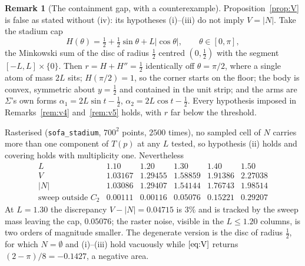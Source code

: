 \documentclass[11pt]{article}
\theoremstyle{definition}
\newtheorem{remark}[theorem]{Remark}
\newcommand{\Sig}{\Sigma}
\begin{document}
\begin{remark}[The containment gap, with a counterexample]\label{rem:v6}
Proposition~\ref{prop:V} is false as stated without (iv): its hypotheses (i)--(iii) do not imply
$V=|N|$. Take the stadium cap
\[
  H(\theta)=\tfrac12+\tfrac12\sin\theta+L|\cos\theta|,\qquad \theta\in[0,\pi],
\]
the Minkowski sum of the disc of radius $\tfrac12$ centred $(0,\tfrac12)$ with the segment
$[-L,L]\times\{0\}$. Then $r=H+H''=\tfrac12$ identically off $\theta=\pi/2$, where a single
atom of mass $2L$ sits; $H(\pi/2)=1$, so the corner starts on the floor; the body is convex,
symmetric about $y=\tfrac12$ and contained in the unit strip; and the arms are $\Sig$'s own
forms $\alpha_1=2L\sin t-\tfrac12$, $\alpha_2=2L\cos t-\tfrac12$. Every hypothesis imposed in
Remarks~\ref{rem:v4} and~\ref{rem:v5} holds, with $r$ far below the threshold.

Rasterised (\verb|sofa_stadium|, $700^2$ points, $2500$ times), no sampled cell of $N$
carries more than one component of $T(p)$ at any $L$ tested, so hypothesis (ii) holds and
covering holds with multiplicity one. Nevertheless
\[
  \begin{array}{r|ccccc}
    L & 1.10 & 1.20 & 1.30 & 1.40 & 1.50\\\hline
    V & 1.03167 & 1.29455 & 1.58859 & 1.91386 & 2.27038\\
    |N| & 1.03086 & 1.29407 & 1.54144 & 1.76743 & 1.98514\\
    \text{sweep outside }C_2 & 0.00111 & 0.00116 & 0.05076 & 0.15221 & 0.29207
  \end{array}
\]
At $L=1.30$ the discrepancy $V-|N|=0.04715$ is $3\%$ and is tracked by the sweep mass
leaving the cap, $0.05076$; the raster noise, visible in the $L\le1.20$ columns, is two
orders of magnitude smaller. The degenerate version is the disc of radius $\tfrac12$, for
which $N=\emptyset$ and (i)--(iii) hold vacuously while $\eqref{eq:V}$ returns
$(2-\pi)/8=-0.1427$, a negative area.


\end{remark}
\end{document}
